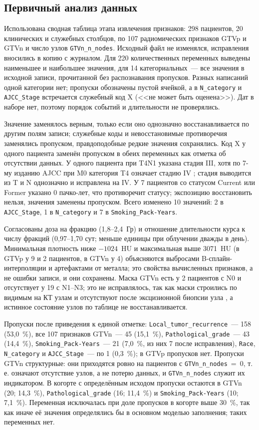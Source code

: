 \documentclass[11pt,a4paper,twocolumn]{article}
\newcommand{\var}[1]{\texttt{#1}}
\begin{document}
\subsection*{Первичный анализ данных}

Использована сводная таблица этапа извлечения признаков: 298 пациентов, 20 клинических и служебных столбцов, по 107 радиомических признаков GTVp и GTVn и число узлов \var{GTVn\_n\_nodes}. Исходный файл не изменялся, исправления вносились в копию с журналом. Для 220 количественных переменных выведены наименьшее и наибольшее значения, для 14 категориальных~--- все значения в исходной записи, прочитанной без распознавания пропусков. Разных написаний одной категории нет; пропуски обозначены пустой ячейкой, а в \var{N\_category} и \var{AJCC\_Stage} встречается служебный код X (<<не может быть оценена>>). Дат в наборе нет, поэтому порядок событий и длительности не проверялись.

Значение заменялось верным, только если оно однозначно восстанавливается по другим полям записи; служебные коды и невосстановимые противоречия заменялись пропуском, правдоподобные редкие значения сохранялись. Код X у одного пациента заменён пропуском в обеих переменных как отметка об отсутствии данных. У одного пациента при T4N1 указана стадия III, хотя по 7-му изданию AJCC при M0 категория T4 означает стадию IV \parencite{edge2010}; стадия выводится из T и N однозначно и исправлена на IV. У 7 пациентов со статусом Current или Former указано 0 пачко-лет, что противоречит статусу; экспозицию восстановить нельзя, значения заменены пропуском. Всего изменено 10 значений: 2 в \var{AJCC\_Stage}, 1 в \var{N\_category} и 7 в \var{Smoking\_Pack-Years}.

Согласованы доза на фракцию (1,8--2,4~Гр) и отношение длительности курса к числу фракций (0,97--1,70 сут; меньше единицы при облучении дважды в день). Минимальная плотность ниже $-1024$~HU и максимальная выше 3071~HU (в GTVp у 9 и 2 пациентов, в GTVn у 4) объясняются выбросами B-сплайн-интерполяции и артефактами от металла; это свойства вычисленных признаков, а не ошибки записи, и они сохранены. Маска GTVn есть у 2 пациентов с N0 и отсутствует у 19 с N1--N3; это не исправлялось, так как маски строились по видимым на КТ узлам и отсутствуют после эксцизионной биопсии узла \parencite{elhalawani2017}, а истинное состояние узлов по таблице не восстанавливается.

Пропуски после приведения к единой отметке: \var{Local\_tumor\_recurrence}~--- 158 (53,0~\%), все 107 признаков GTVn~--- 45 (15,1~\%), \var{Pathological\_grade}~--- 43 (14,4~\%), \var{Smoking\_Pack-Years}~--- 21 (7,0~\%, из них 7 после исправления), \var{Race}, \var{N\_category} и \var{AJCC\_Stage}~--- по 1 (0,3~\%); в GTVp пропусков нет. Пропуски GTVn структурные: они приходятся ровно на пациентов с \var{GTVn\_n\_nodes}~=~0, т.\,е. означают отсутствие узлов, а не потерю данных, и \var{GTVn\_n\_nodes} служит их индикатором. В когорте с определённым исходом пропуски остаются в GTVn (20; 14,3~\%), \var{Pathological\_grade} (16; 11,4~\%) и \var{Smoking\_Pack-Years} (10; 7,1~\%). Переменная исключалась при доле пропусков в когорте выше 30~\%, так как иначе её значения определялись бы в основном моделью заполнения; таких переменных нет.
\end{document}
